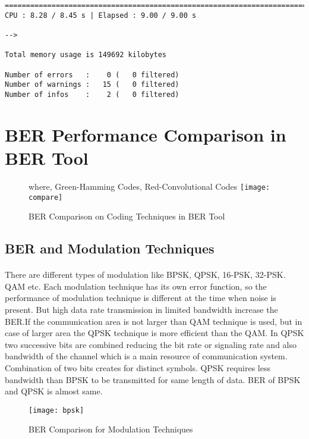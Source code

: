 \documentclass[14pt]{report}
\begin{document}
{\begin{verbatim}
=========================================================================
CPU : 8.28 / 8.45 s | Elapsed : 9.00 / 9.00 s
 
--> 

Total memory usage is 149692 kilobytes

Number of errors   :    0 (   0 filtered)
Number of warnings :   15 (   0 filtered)
Number of infos    :    2 (   0 filtered)
\end{verbatim}
\section{BER Performance Comparison in BER Tool}
\begin{figure}[ht]{where, Green-Hamming Codes, Red-Convolutional Codes}
\centering
\texttt{[image: compare]}
\caption{BER Comparison on Coding Techniques in BER Tool}
\end{figure}
\subsection*{BER and Modulation Techniques}
\paragraph{} There are different types of modulation like BPSK, QPSK, 16-PSK, 32-PSK. QAM etc. Each modulation technique has its own error function, so the performance of modulation technique is different at the time when noise is present. But high data rate transmission in limited bandwidth increase the BER.If the communication area is not larger than QAM technique  is used, but in case of larger area the QPSK technique is more efficient than the QAM. In QPSK two successive bits are combined reducing the bit rate or signaling rate and also bandwidth of the channel which is a main resource of communication system. Combination of two bits creates for distinct symbols. QPSK requires less bandwidth than BPSK to be transmitted for same length of data. BER of BPSK and QPSK is almost same.
\begin{figure}[ht]
\centering
\texttt{[image: bpsk]}
\caption{BER Comparison for Modulation Techniques}
\end{figure}
}
\end{document}
